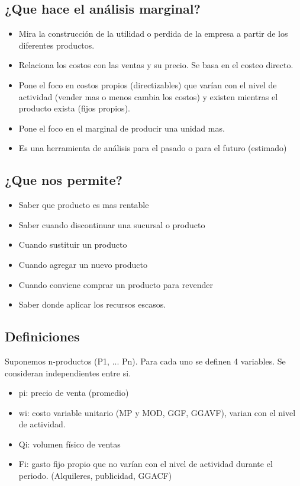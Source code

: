 \documentclass[titlepage,a4paper]{article}
\begin{document}
\subsection*{¿Que hace el análisis marginal?}
\begin{itemize}
\item Mira la construcción de la utilidad o perdida de la empresa a partir de los diferentes productos.
\item Relaciona los costos con las ventas y su precio. Se basa en el costeo directo.
\item Pone el foco en costos propios (directizables) que varían con el nivel de actividad (vender mas o menos cambia los costos) y existen mientras el producto exista (fijos propios).
\item Pone el foco en el marginal de producir una unidad mas.
\item Es una herramienta de análisis para el pasado o para el futuro (estimado)
\end{itemize}


\subsection*{¿Que nos permite?}
\begin{itemize}
\item Saber que producto es mas rentable
\item Saber cuando discontinuar una sucursal o producto
\item Cuando sustituir un producto
\item Cuando agregar un nuevo producto
\item Cuando conviene comprar un producto para revender
\item Saber donde aplicar los recursos escasos.
\end{itemize}


\subsection*{Definiciones}
Suponemos n-productos (P1, ... Pn). Para cada uno se definen 4 variables. Se consideran independientes entre si.

\begin{itemize}
\item pi: precio de venta (promedio)
\item wi: costo variable unitario (MP y MOD, GGF, GGAVF), varian con el nivel de actividad.
\item Qi: volumen físico de ventas
\item Fi: gasto fijo propio que no varían con el nivel de actividad durante el periodo. (Alquileres, publicidad, GGACF)
\end{itemize}
\end{document}
